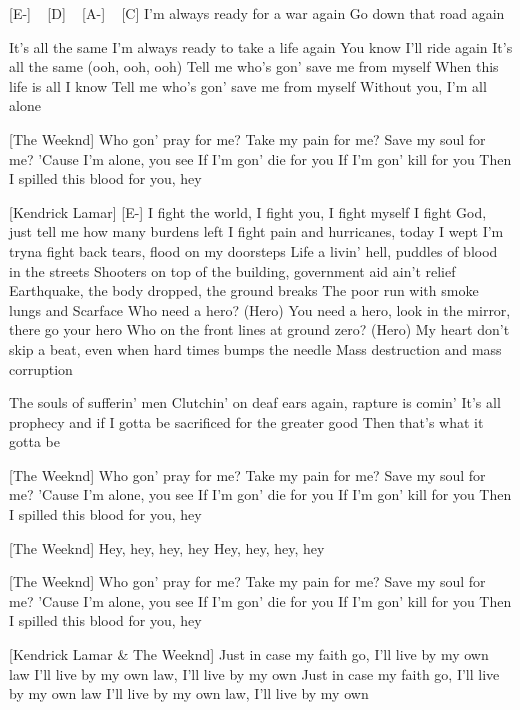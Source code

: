 [E-] ~ [D] ~ [A-] ~ [C]
I'm always ready for a war again
Go down that road again

It's all the same
I'm always ready to take a life again
You know I'll ride again
It's all the same (ooh, ooh, ooh)
Tell me who's gon' save me from myself
When this life is all I know
Tell me who's gon' save me from myself
Without you, I'm all alone

[The Weeknd]
Who gon' pray for me?
Take my pain for me?
Save my soul for me?
'Cause I'm alone, you see
If I'm gon' die for you
If I'm gon' kill for you
Then I spilled this blood for you, hey


[Kendrick Lamar]
[E-]
I fight the world, I fight you, I fight myself
I fight God, just tell me how many burdens left
I fight pain and hurricanes, today I wept
I'm tryna fight back tears, flood on my doorsteps
Life a livin' hell, puddles of blood in the streets
Shooters on top of the building, government aid ain't relief
Earthquake, the body dropped, the ground breaks
The poor run with smoke lungs and Scarface
Who need a hero? (Hero)
You need a hero, look in the mirror, there go your hero
Who on the front lines at ground zero? (Hero)
My heart don't skip a beat, even when hard times bumps the needle
Mass destruction and mass corruption

The souls of sufferin' men
Clutchin' on deaf ears again, rapture is comin'
It's all prophecy and if I gotta be sacrificed for the greater good
Then that's what it gotta be

[The Weeknd]
Who gon' pray for me?
Take my pain for me?
Save my soul for me?
'Cause I'm alone, you see
If I'm gon' die for you
If I'm gon' kill for you
Then I spilled this blood for you, hey

[The Weeknd]
Hey, hey, hey, hey
Hey, hey, hey, hey


[The Weeknd]
Who gon' pray for me?
Take my pain for me?
Save my soul for me?
'Cause I'm alone, you see
If I'm gon' die for you
If I'm gon' kill for you
Then I spilled this blood for you, hey

[Kendrick Lamar \& The Weeknd]
Just in case my faith go, I'll live by my own law
I'll live by my own law, I'll live by my own
Just in case my faith go, I'll live by my own law
I'll live by my own law, I'll live by my own

